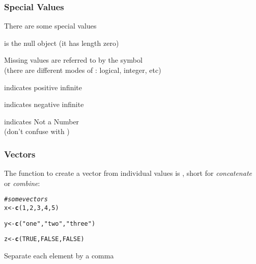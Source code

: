 \documentclass[12pt]{beamer}\usepackage[]{graphicx}\usepackage[]{color}
\makeatletter
\newcommand{\hlnum}[1]{\textcolor[rgb]{0.686,0.059,0.569}{#1}}%
\newcommand{\hlstr}[1]{\textcolor[rgb]{0.192,0.494,0.8}{#1}}%
\newcommand{\hlcom}[1]{\textcolor[rgb]{0.678,0.584,0.686}{\textit{#1}}}%
\newcommand{\hlstd}[1]{\textcolor[rgb]{0.345,0.345,0.345}{#1}}%
\newcommand{\hlkwb}[1]{\textcolor[rgb]{0.69,0.353,0.396}{#1}}%
\newcommand{\hlkwd}[1]{\textcolor[rgb]{0.737,0.353,0.396}{\textbf{#1}}}%
\newenvironment{kframe}{%
 \def\at@end@of@kframe{}%
 \ifinner\ifhmode%
  \def\at@end@of@kframe{\end{minipage}}%
  \begin{minipage}{\columnwidth}%
 \fi\fi%
 \def\FrameCommand##1{\hskip\@totalleftmargin \hskip-\fboxsep
 \colorbox{shadecolor}{##1}\hskip-\fboxsep
     \hskip-\linewidth \hskip-\@totalleftmargin \hskip\columnwidth}%
 \MakeFramed {\advance\hsize-\width
   \@totalleftmargin\z@ \linewidth\hsize
   \@setminipage}}%
 {\par\unskip\endMakeFramed%
 \at@end@of@kframe}
\newenvironment{knitrout}{}{} %
\makeatother
\begin{document}

\begin{frame}[fragile]
\frametitle{Special Values}

There are some special values 
\bbi
  \item {} is the null object (it has length zero)
  \item Missing values are referred to by the symbol  \\
  {\lolit (there are different modes of : logical, integer, etc)}
  \item {} indicates positive infinite
  \item {} indicates negative infinite
  \item {} indicates Not a Number \\
  {\lolit (don't confuse  with )}

\ei

\end{frame}


\begin{frame}[fragile]
\frametitle{Vectors}

The function to create a vector from individual values is {\hilit {}}, 
short for \textit{concatenate} or \textit{combine}:

\begin{knitrout}\footnotesize
{}\color{fgcolor}\begin{kframe}
\begin{alltt}
\hlcom{# some vectors}
\hlstd{x} \hlkwb{<-} \hlkwd{c}\hlstd{(}\hlnum{1}\hlstd{,} \hlnum{2}\hlstd{,} \hlnum{3}\hlstd{,} \hlnum{4}\hlstd{,} \hlnum{5}\hlstd{)}

\hlstd{y} \hlkwb{<-} \hlkwd{c}\hlstd{(}\hlstr{"one"}\hlstd{,} \hlstr{"two"}\hlstd{,} \hlstr{"three"}\hlstd{)}

\hlstd{z} \hlkwb{<-} \hlkwd{c}\hlstd{(}\hlnum{TRUE}\hlstd{,} \hlnum{FALSE}\hlstd{,} \hlnum{FALSE}\hlstd{)}
\end{alltt}
\end{kframe}
\end{knitrout}
Separate each element by a comma

\end{frame}

\end{document}
